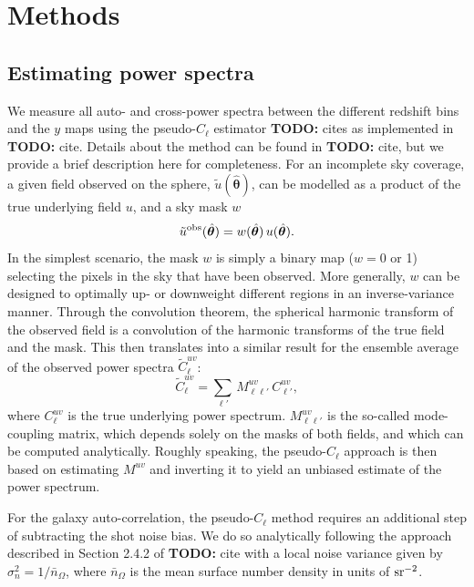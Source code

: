 \documentclass[useAMS,usenatbib]{mn2e}
\newcommand{\nv}{\hat{\boldsymbol{\theta}}}
\newcommand{\TODO}[1]{{\bf TODO:} #1}
\begin{document}
\section{Methods}\label{sec:methods}
  \subsection{Estimating power spectra}\label{ssec:methods.cls}
    We measure all auto- and cross-power spectra between the different redshift bins and the $y$ maps using the pseudo-$C_\ell$ estimator \TODO{cites} as implemented in \TODO{cite}. Details about the method can be found in \TODO{cite}, but we provide a brief description here for completeness. For an incomplete sky coverage, a given field observed on the sphere, $\tilde{u}(\nv)$, can be modelled as a product of the true underlying field $u$, and a sky mask $w$
    \begin{equation}
      \tilde{u}^{\rm obs}(\nv) = w(\nv)\,u(\nv).
    \end{equation}
    In the simplest scenario, the mask $w$ is simply a binary map ($w=0$ or 1) selecting the pixels in the sky that have been observed. More generally, $w$ can be designed to optimally up- or downweight different regions in an inverse-variance manner. Through the convolution theorem, the spherical harmonic transform of the observed field is a convolution of the harmonic transforms of the true field and the mask. This then translates into a similar result for the ensemble average of the observed power spectra $\tilde{C}^{uv}_\ell$:
    \begin{equation}
      \tilde{C}^{uv}_\ell = \sum_{\ell'}\,M^{uv}_{\ell \ell'}\, C^{uv}_{\ell'},
    \end{equation}
    where $C^{uv}_\ell$ is the true underlying power spectrum. $M^{uv}_{\ell \ell'}$ is the so-called mode-coupling matrix, which depends solely on the masks of both fields, and which can be computed analytically. Roughly speaking, the pseudo-$C_\ell$ approach is then based on estimating $M^{uv}$ and inverting it to yield an unbiased estimate of the power spectrum.
    
    For the galaxy auto-correlation, the pseudo-$C_\ell$ method requires an additional step of subtracting the shot noise bias. We do so analytically following the approach described in Section 2.4.2 of \TODO{cite} with a local noise variance given by $\sigma_n^2=1/\bar{n}_\Omega$, where $\bar{n}_\Omega$ is the mean surface number density in units of ${\rm sr}^{-2}$.
\end{document}
